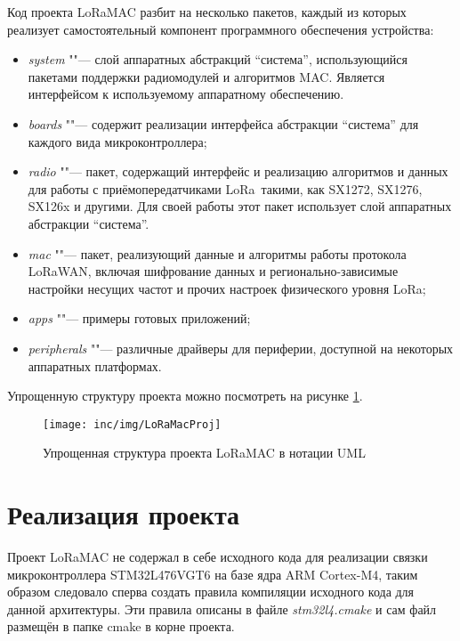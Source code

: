 Код проекта LoRaMAC разбит на несколько пакетов, каждый из которых реализует 
самостоятельный компонент программного обеспечения устройства:
\begin{itemize}
 \item \textit{system} ""--- слой аппаратных абстракций ``система'', 
использующийся пакетами поддержки радиомодулей и алгоритмов MAC. Является 
интерфейсом к используемому аппаратному обеспечению.
 \item \textit{boards} ""--- содержит реализации интерфейса абстракции 
``система'' для каждого вида микроконтроллера;
 \item \textit{radio} ""--- пакет, содержащий интерфейс и реализацию алгоритмов 
и данных для работы с приёмопередатчиками LoRa\texttrademark~такими, как 
SX1272, SX1276, 
SX126x и другими. Для своей работы этот пакет использует слой аппаратных 
абстракции ``система''. 
 \item \textit{mac} ""--- пакет, реализующий данные и алгоритмы работы 
протокола LoRaWAN\texttrademark, включая шифрование данных и 
регионально-зависимые настройки 
несущих частот и прочих настроек физического уровня LoRa\texttrademark;
 \item \textit{apps} ""--- примеры готовых приложений;
 \item \textit{peripherals} ""--- различные драйверы для периферии, доступной 
на некоторых аппаратных платформах.
\end{itemize}

Упрощенную структуру проекта можно посмотреть на рисунке 
\ref{fig:loramacstructure}.

\begin{figure}[!h]
  \centering
  \texttt{[image: inc/img/LoRaMacProj]}
  \caption{Упрощенная структура проекта LoRaMAC в нотации UML}
  \label{fig:loramacstructure}
\end{figure}

\section{Реализация проекта}

Проект LoRaMAC не содержал в себе исходного кода для реализации связки 
микроконтроллера STM32L476VGT6 на базе ядра ARM Cortex-M4, таким образом 
следовало сперва создать правила компиляции исходного кода для данной 
архитектуры. Эти правила описаны в файле \textit{stm32l4.cmake} и сам файл 
размещён в папке cmake в корне проекта. 

